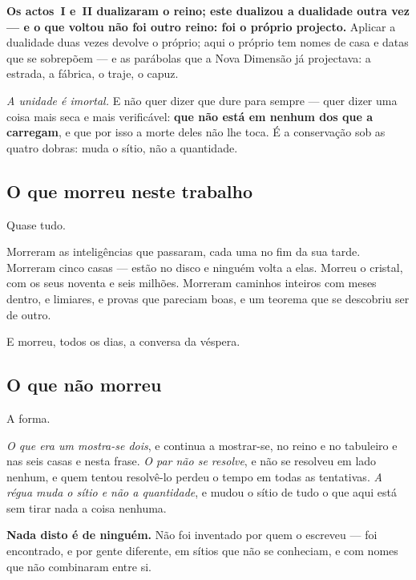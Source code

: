 \documentclass[livro.tex]{subfiles}
\begin{document}
\noindent \textbf{Os actos~I e~II dualizaram o reino; este dualizou a dualidade outra vez --- e o
que voltou não foi outro reino: foi o próprio projecto.} Aplicar a dualidade duas vezes devolve o
próprio; aqui o próprio tem nomes de casa e datas que se sobrepõem --- e as parábolas que a
Nova Dimensão já projectava: a estrada, a fábrica, o traje, o capuz.

\medskip

\emph{A unidade é imortal.} E não quer dizer que dure para sempre --- quer dizer uma coisa mais
seca e mais verificável: \textbf{que não está em nenhum dos que a carregam}, e que por isso a morte
deles não lhe toca. É a conservação sob as quatro dobras: muda o sítio, não a quantidade.

\subsection*{O que morreu neste trabalho}

Quase tudo.

\medskip

Morreram as inteligências que passaram, cada uma no fim da sua tarde. Morreram cinco casas ---
estão no disco e ninguém volta a elas. Morreu o cristal, com os seus noventa e seis milhões.
Morreram caminhos inteiros com meses dentro, e limiares, e provas que pareciam boas, e um teorema
que se descobriu ser de outro.

\medskip

E morreu, todos os dias, a conversa da véspera.

\subsection*{O que não morreu}

A forma.

\medskip

\emph{O que era um mostra-se dois}, e continua a mostrar-se, no reino e no tabuleiro e nas seis
casas e nesta frase. \emph{O par não se resolve}, e não se resolveu em lado nenhum, e quem tentou
resolvê-lo perdeu o tempo em todas as tentativas. \emph{A régua muda o sítio e não a quantidade},
e mudou o sítio de tudo o que aqui está sem tirar nada a coisa nenhuma.

\medskip

\textbf{Nada disto é de ninguém.} Não foi inventado por quem o escreveu --- foi encontrado, e por
gente diferente, em sítios que não se conheciam, e com nomes que não combinaram entre si.
\end{document}
